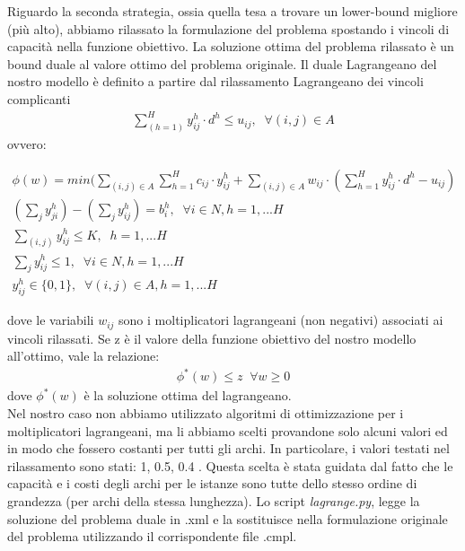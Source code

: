 \documentclass{article}
\begin{document}
Riguardo la seconda strategia, ossia quella tesa a trovare un lower-bound migliore (più alto), abbiamo rilassato la formulazione del problema spostando i vincoli di capacità nella funzione obiettivo. La soluzione ottima del problema rilassato è un bound duale al valore ottimo del problema originale.
Il duale Lagrangeano del nostro modello è definito a partire dal rilassamento Lagrangeano dei vincoli complicanti 
\begin{align}
    \sum_{(h=1)}^H y_{ij}^h \cdot d^h \leq u_{ij}, \; \; \forall (i,j) \in A
    \label{eq:vcap}
\end{align}
ovvero:

\begin{align}
    \phi(w) = min (\sum_{(i,j) \in A}\sum_{h=1}^H c_{ij} \cdot y_{ij}^h + \sum_{(i,j) \in A} w_{ij} \cdot(\sum_{h=1}^H y_{ij}^h \cdot d^h - u_{ij})
    \label{mod:lagobj}
    \\
    (\sum_{j}y_{ji}^h)- (\sum_{j}y_{ij}^h ) = b_i^h, \; \; \forall i \in N, h=1, ... H
    \label{mod:lagv2}
    \\
    \sum_{(i,j)} y_{ij}^h  \leq K, \; \; h=1, ... H
    \label{mod:lagv4}
    \\
    \sum_{j} y_{ij}^h \leq 1, \; \; \forall i \in \textit{N} , h=1, ... H
    \label{mod:lagv5}
    \\
     y_{ij}^h \in \{0,1\}, \; \; \forall (i,j) \in A, h=1, ... H
    \label{mod:lag}
\end{align}


dove le variabili $w_{ij}$ sono i moltiplicatori lagrangeani (non negativi) associati ai vincoli rilassati.
Se z è il valore della funzione obiettivo del nostro modello all'ottimo, vale la relazione:
\begin{align}
 \phi^*(w) \leq z \; \;     \forall w \geq 0
\end{align}
dove  $\phi^*(w)$ è la soluzione ottima del lagrangeano.
\\
Nel nostro caso non abbiamo utilizzato algoritmi di ottimizzazione per i moltiplicatori lagrangeani, ma li abbiamo scelti provandone solo alcuni valori ed in modo che fossero costanti per tutti gli archi. In particolare, i valori testati nel rilassamento sono stati: 1, 0.5, 0.4 .
Questa scelta è stata guidata dal fatto che le capacità e i costi degli archi per le istanze sono tutte dello stesso ordine di grandezza (per archi della stessa lunghezza). Lo script \emph{lagrange.py}, legge la soluzione del problema duale in .xml e la sostituisce nella formulazione originale del problema utilizzando il corrispondente file .cmpl.
\end{document}
